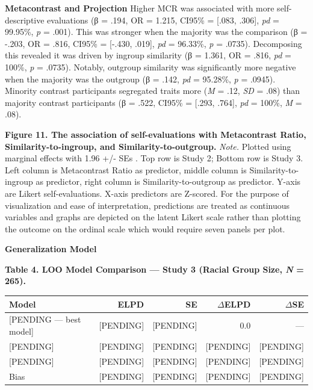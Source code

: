 \documentclass[
  man,
  longtable,
  nolmodern,
  notxfonts,
  notimes,
  man]{apa7}
\begin{document}
\textbf{Metacontrast and Projection} Higher MCR was associated with more
self-descriptive evaluations (β = .194, OR = 1.215, CI95\% = {[}.083,
.306{]}, \emph{pd} = 99.95\%, \emph{p} = .001). This was stronger when
the majority was the comparison (β = -.203, OR = .816, CI95\% =
{[}-.430, .019{]}, \emph{pd} = 96.33\%, \emph{p} = .0735). Decomposing
this revealed it was driven by ingroup similarity (β = 1.361, OR = .816,
\emph{pd} = 100\%, \emph{p} = .0735). Notably, outgroup similarity was
significantly more negative when the majority was the outgroup (β =
.142, \emph{pd} = 95.28\%, \emph{p} = .0945). Minority contrast
participants segregated traits more (\emph{M} = .12, \emph{SD} = .08)
than majority contrast participants (β = .522, CI95\% = {[}.293,
.764{]}, \emph{pd} = 100\%, \emph{M} = .08).

\textbf{Figure 11. The association of self-evaluations with Metacontrast
Ratio, Similarity-to-ingroup, and Similarity-to-outgroup.} \emph{Note.}
Plotted using marginal effects with 1.96 +/- SEs . Top row is Study 2;
Bottom row is Study 3. Left column is Metacontrast Ratio as predictor,
middle column is Similarity-to-ingroup as predictor, right column is
Similarity-to-outgroup as predictor. Y-axis are Likert self-evaluations.
X-axis predictors are Z-scored. For the purpose of visualization and
ease of interpretation, predictions are treated as continuous variables
and graphs are depicted on the latent Likert scale rather than plotting
the outcome on the ordinal scale which would require seven panels per
plot.

\textbf{Generalization Model}

\textbf{Table 4. LOO Model Comparison --- Study 3 (Racial Group Size,
\emph{N} = 265).}

\begin{longtable}[]{@{}lrrrr@{}}
\toprule\noalign{}
Model & ELPD & SE & \(\Delta\)ELPD & \(\Delta\)SE \\
\midrule\noalign{}
\endhead
\bottomrule\noalign{}
\endlastfoot
{[}PENDING --- best model{]} & {[}PENDING{]} & {[}PENDING{]} & 0.0 &
--- \\
{[}PENDING{]} & {[}PENDING{]} & {[}PENDING{]} & {[}PENDING{]} &
{[}PENDING{]} \\
{[}PENDING{]} & {[}PENDING{]} & {[}PENDING{]} & {[}PENDING{]} &
{[}PENDING{]} \\
Bias & {[}PENDING{]} & {[}PENDING{]} & {[}PENDING{]} & {[}PENDING{]} \\
\end{longtable}
\end{document}
